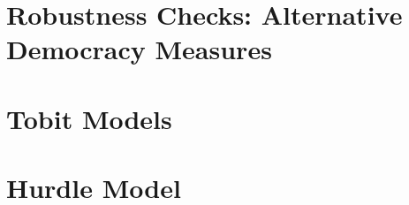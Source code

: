 \documentclass[12pt]{article}
\begin{document}
\section{Robustness Checks: Alternative Democracy Measures}
\begin{table}[H]
\centering
\label{app:alterantive_rob}

\end{table}


\section{Tobit Models}
\begin{table}[H]
\centering
\label{app:tobit}

\end{table}

\section{Hurdle Model}
\begin{table}[H]
\centering
\label{app:hurdle}

\end{table}
\end{document}
